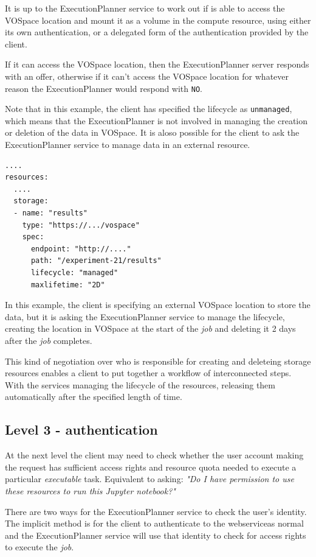 \documentclass[11pt,a4paper]{ivoa}
\newcommand{\webservice} {webservice}
\newcommand{\vospace} {VOSpace}
\newcommand{\execplanner} {ExecutionPlanner}
\newcommand{\jupyternotebook} {Jupyter notebook}
\newcommand{\codeword}[1] {\texttt{#1}}
\newcommand{\excutabletask} {\textit{executable} task}
\newcommand{\job} {\textit{job}}
\begin{document}
It is up to the \execplanner{} service to work out if is able to access the
\vospace{} location and mount it as a volume in the compute resource,
using either its own authentication, or a delegated form of the authentication
provided by the client.

If it can access the \vospace{} location, then the \execplanner{} server responds
with an offer, otherwise if it can't access the \vospace{} location for whatever
reason the \execplanner{} would respond with \codeword{NO}.

Note that in this example, the client has specified the lifecycle as \codeword{unmanaged},
which means that the \execplanner{} is not involved in managing the creation or deletion
of the data in \vospace.
It is aloso possible for the client to ask the \execplanner{} service to manage
data in an external resource.

\begin{lstlisting}[]
....
resources:
  ....
  storage:
  - name: "results"
    type: "https://.../vospace"
    spec:
      endpoint: "http://...."
      path: "/experiment-21/results"
      lifecycle: "managed"
      maxlifetime: "2D"
\end{lstlisting}

In this example, the client is specifying an external \vospace{} location to store the data,
but it is asking the \execplanner{} service to manage the lifecycle, creating the location
in \vospace{} at the start of the \job{} and deleting it 2 days after the \job{} completes.

This kind of negotiation over who is responsible for creating and deleteing storage resources
enables a client to put together a workflow of interconnected steps. With the services
managing the lifecycle of the resources, releasing them automatically after the
specified length of time.

\subsection{Level 3 - authentication}
\label{authentication}

At the next level the client may need to check whether the user account making the request
has sufficient access rights and resource quota needed to execute a particular \excutabletask{}.
Equivalent to asking:
\textit{"Do I have permission to use these resources to run this \jupyternotebook{}?"}

There are two ways for the \execplanner{} service to check the user's identity.
The implicit method is for the client to authenticate to the \webservice as normal
and the \execplanner{} service will use that identity to check for access rights
to execute the \job{}.
\end{document}
